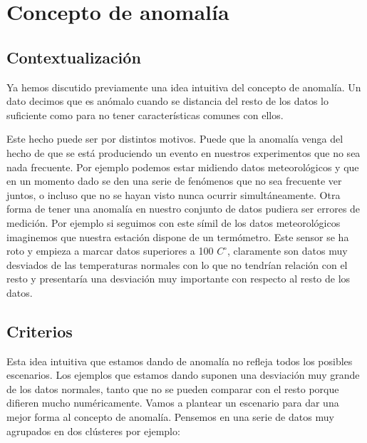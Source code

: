 \chapter{Concepto de anomalía}
\label{chapter:anomalia}

\section{Contextualización}

Ya hemos discutido previamente una idea intuitiva del concepto de anomalía. Un dato decimos que es anómalo cuando se distancia del resto de los datos lo suficiente como para no tener características comunes con ellos.

Este hecho puede ser por distintos motivos. Puede que la anomalía venga del hecho de que se está produciendo un evento en nuestros experimentos que no sea nada frecuente. Por ejemplo podemos estar midiendo datos meteorológicos y que en un momento dado se den una serie de fenómenos que no sea frecuente ver juntos, o incluso que no se hayan visto nunca ocurrir simultáneamente. Otra forma de tener una anomalía en nuestro conjunto de datos pudiera ser errores de medición. Por ejemplo si seguimos con este símil de los datos meteorológicos imaginemos que nuestra estación dispone de un termómetro. Este sensor se ha roto y empieza a marcar datos superiores a 100 $C^\circ$, claramente son datos muy desviados de las temperaturas normales con lo que no tendrían relación con el resto y presentaría una desviación muy importante con respecto al resto de los datos.

\section{Criterios}

Esta idea intuitiva que estamos dando de anomalía no refleja todos los posibles escenarios. Los ejemplos que estamos dando suponen una desviación muy grande de los datos normales, tanto que no se pueden comparar con el resto porque difieren mucho numéricamente. Vamos a plantear un escenario para dar una mejor forma al concepto de anomalía. Pensemos en una serie de datos muy agrupados en dos clústeres por ejemplo:

